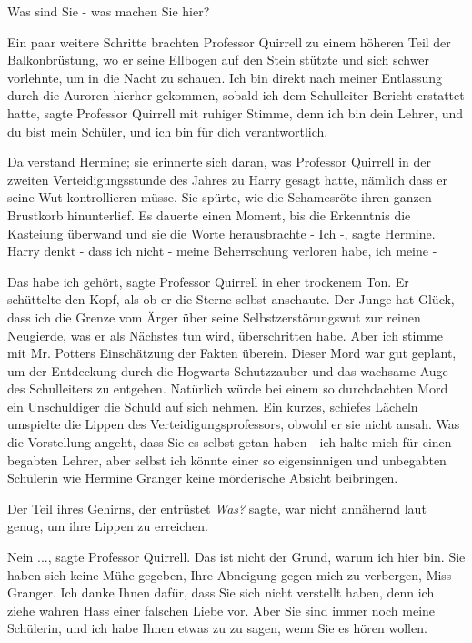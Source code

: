 \glqq{}Was sind Sie - was machen Sie hier?\grqq{}

Ein paar weitere Schritte brachten Professor Quirrell zu einem höheren Teil der
Balkonbrüstung, wo er seine Ellbogen auf den Stein stützte und sich schwer
vorlehnte, um in die Nacht zu schauen. \glqq{}Ich bin direkt nach meiner
Entlassung durch die Auroren hierher gekommen, sobald ich dem Schulleiter
Bericht erstattet hatte\grqq{}, sagte Professor Quirrell mit ruhiger Stimme,
\glqq{}denn ich bin dein Lehrer, und du bist mein Schüler, und ich bin für dich
verantwortlich.\grqq{}

Da verstand Hermine; sie erinnerte sich daran, was Professor Quirrell in der
zweiten Verteidigungsstunde des Jahres zu Harry gesagt hatte, nämlich dass er
seine Wut kontrollieren müsse. Sie spürte, wie die Schamesröte ihren ganzen
Brustkorb hinunterlief. Es dauerte einen Moment, bis die Erkenntnis die
Kasteiung überwand und sie die Worte herausbrachte - \glqq{}Ich -\grqq{}, sagte
Hermine. \glqq{}Harry denkt - dass ich nicht - meine Beherrschung verloren habe,
ich meine -\grqq{}

\glqq{}Das habe ich gehört\grqq{}, sagte Professor Quirrell in eher trockenem
Ton. Er schüttelte den Kopf, als ob er die Sterne selbst anschaute. \glqq{}Der
Junge hat Glück, dass ich die Grenze vom Ärger über seine Selbstzerstörungswut
zur reinen Neugierde, was er als Nächstes tun wird, überschritten habe. Aber ich
stimme mit Mr. Potters Einschätzung der Fakten überein. Dieser Mord war gut
geplant, um der Entdeckung durch die Hogwarts-Schutzzauber und das wachsame Auge
des Schulleiters zu entgehen. Natürlich würde bei einem so durchdachten Mord ein
Unschuldiger die Schuld auf sich nehmen.\grqq{} Ein kurzes, schiefes Lächeln
umspielte die Lippen des Verteidigungsprofessors, obwohl er sie nicht ansah.
\glqq{}Was die Vorstellung angeht, dass Sie es selbst getan haben - ich halte
mich für einen begabten Lehrer, aber selbst ich könnte einer so eigensinnigen
und unbegabten Schülerin wie Hermine Granger keine mörderische Absicht
beibringen.\grqq{}

Der Teil ihres Gehirns, der entrüstet \emph{\glqq{}Was?\grqq{}} sagte, war nicht
annähernd laut genug, um ihre Lippen zu erreichen.

\glqq{}Nein ...\grqq{}, sagte Professor Quirrell. \glqq{}Das ist nicht der Grund,
warum ich hier bin. Sie haben sich keine Mühe gegeben, Ihre Abneigung gegen mich
zu verbergen, Miss Granger. Ich danke Ihnen dafür, dass Sie sich nicht verstellt
haben, denn ich ziehe wahren Hass einer falschen Liebe vor. Aber Sie sind immer
noch meine Schülerin, und ich habe Ihnen etwas zu zu sagen, wenn Sie es hören
wollen.\grqq{}

